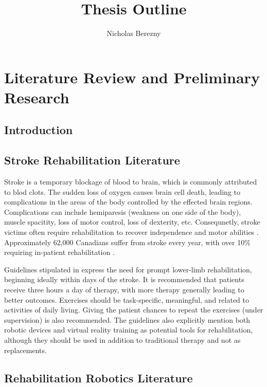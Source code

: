 \documentclass[12pt]{article}
\author{Nicholas Berezny}
\title{Thesis Outline}
\begin{document}
\maketitle
\newpage

\section{Literature Review and Preliminary Research}

	\subsection{Introduction}

	\subsection{Stroke Rehabilitation Literature}
%

Stroke is a temporary blockage of blood to brain, which is commonly attributed to blod clots. The sudden loss of oxygen causes brain cell death, leading to complications in the areas of the body controlled by the effected brain regions. Complications can include hemiparesis (weakness on one side of the body), muscle spacitity, loss of motor control, loss of dexterity, etc. Consequnetly, stroke victims often require rehabilitation to recover independence and motor abilities \cite{Stroke}. Approximately 62,000 Canadians suffer from stroke every year, with over 10\% requiring in-patient rehabilitation \cite{Hebert2016}. 

Guidelines stipulated in \cite{Hebert2016} express the need for prompt lower-limb rehabilitation, beginning ideally within days of the stroke. It is recommended that patients receive three hours a day of therapy, with more therapy generally leading to better outcomes. Exercises should be task-specific, meaningful, and related to activities of daily living. Giving the patient chances to repeat the exercises (under supervision) is also recommended.  The guidelines also explicitly mention both robotic devices and virtual reality training as potential tools for rehabilitation, although they should be used in addition to traditional therapy and not as replacements.  


	\subsection{Rehabilitation Robotics Literature}
	
\end{document}
